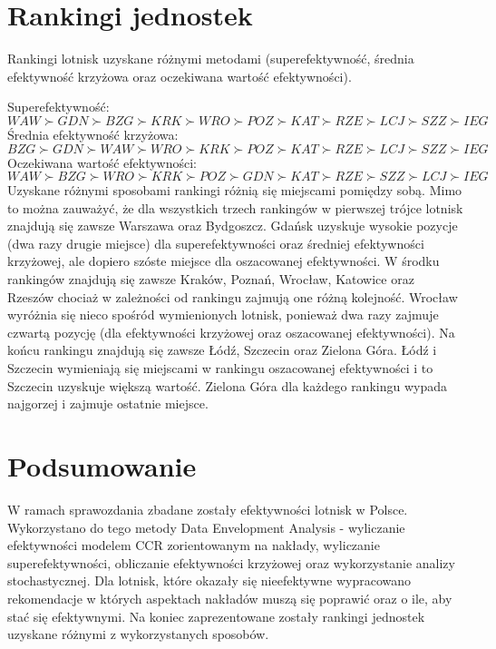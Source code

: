 \documentclass[a4paper,12pt]{article}
\begin{document}
\section{Rankingi jednostek}
Rankingi lotnisk uzyskane różnymi metodami (superefektywność, średnia efektywność krzyżowa oraz oczekiwana wartość efektywności).

\noindent Superefektywność: $ WAW \succ GDN \succ BZG \succ KRK \succ WRO \succ POZ \succ KAT \succ RZE \succ LCJ \succ SZZ \succ IEG$ \\
Średnia efektywność krzyżowa: $ BZG \succ GDN \succ WAW \succ WRO \succ KRK \succ POZ \succ KAT \succ RZE \succ LCJ \succ SZZ \succ IEG $ \\
Oczekiwana wartość efektywności: $ WAW \succ BZG \succ WRO \succ KRK \succ POZ \succ GDN \succ KAT \succ RZE \succ SZZ \succ LCJ \succ IEG $ \\

\noindent Uzyskane różnymi sposobami rankingi różnią się miejscami pomiędzy sobą.
Mimo to można zauważyć, że dla wszystkich trzech rankingów w pierwszej trójce lotnisk znajdują się zawsze Warszawa oraz Bydgoszcz.
Gdańsk uzyskuje wysokie pozycje (dwa razy drugie miejsce) dla superefektywności oraz średniej efektywności krzyżowej, ale dopiero szóste miejsce dla oszacowanej efektywności.
W środku rankingów znajdują się zawsze Kraków, Poznań, Wrocław, Katowice oraz Rzeszów chociaż w zależności od rankingu zajmują one różną kolejność.
Wrocław wyróżnia się nieco spośród wymienionych lotnisk, ponieważ dwa razy zajmuje czwartą pozycję (dla efektywności krzyżowej oraz oszacowanej efektywności).
Na końcu rankingu znajdują się zawsze Łódź, Szczecin oraz Zielona Góra. Łódź i Szczecin wymieniają się miejscami w rankingu oszacowanej efektywności i to Szczecin uzyskuje większą wartość.
Zielona Góra dla każdego rankingu wypada najgorzej i zajmuje ostatnie miejsce.

\section{Podsumowanie}

W ramach sprawozdania zbadane zostały efektywności lotnisk w Polsce. Wykorzystano do tego metody Data Envelopment Analysis - wyliczanie efektywności modelem CCR zorientowanym na nakłady, wyliczanie superefektywności, obliczanie efektywności krzyżowej oraz wykorzystanie analizy stochastycznej.
Dla lotnisk, które okazały się nieefektywne wypracowano rekomendacje w których aspektach nakładów muszą się poprawić oraz o ile, aby stać się efektywnymi. Na koniec zaprezentowane zostały rankingi jednostek uzyskane różnymi z wykorzystanych sposobów.
\end{document}
